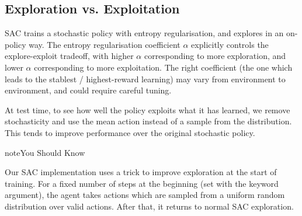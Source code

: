 \documentclass[letterpaper,10pt,english]{sphinxmanual}
\begin{document}
\subsection{Exploration vs. Exploitation}
\label{\detokenize{algorithms/lac:exploration-vs-exploitation}}
SAC trains a stochastic policy with entropy regularisation, and explores in an on-policy way. The entropy regularisation coefficient \(\alpha\) explicitly controls the explore-exploit tradeoff, with higher \(\alpha\) corresponding to more exploration, and lower \(\alpha\) corresponding to more exploitation. The right coefficient (the one which leads to the stablest / highest-reward learning) may vary from environment to environment, and could require careful tuning.

At test time, to see how well the policy exploits what it has learned, we remove stochasticity and use the mean action instead of a sample from the distribution. This tends to improve performance over the original stochastic policy.

\begin{sphinxadmonition}{note}{You Should Know}

Our SAC implementation uses a trick to improve exploration at the start of training. For a fixed number of steps at the beginning (set with the  keyword argument), the agent takes actions which are sampled from a uniform random distribution over valid actions. After that, it returns to normal SAC exploration.
\end{sphinxadmonition}
\end{document}
